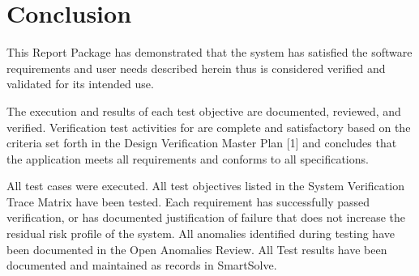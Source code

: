 \newpage
\section{Conclusion}
This Report Package has demonstrated that the \vssShort system has satisfied
the software requirements and user needs described herein thus is considered 
verified and validated for its intended use.

The execution and results of each test objective are documented, reviewed, and 
verified. Verification test activities for \vssLong are complete and 
satisfactory based on the criteria set forth in the Design 
Verification Master Plan [1] and concludes that the \vssShort application 
meets all requirements and conforms to all specifications.

All test cases were executed.
All test objectives listed in the System Verification Trace Matrix
have been tested.
Each requirement has successfully passed verification, or has documented 
justification of failure that does not increase the residual risk profile of 
the system.
All anomalies identified during testing have been documented in the Open 
Anomalies Review.
All Test results have been documented and maintained as records in SmartSolve.

